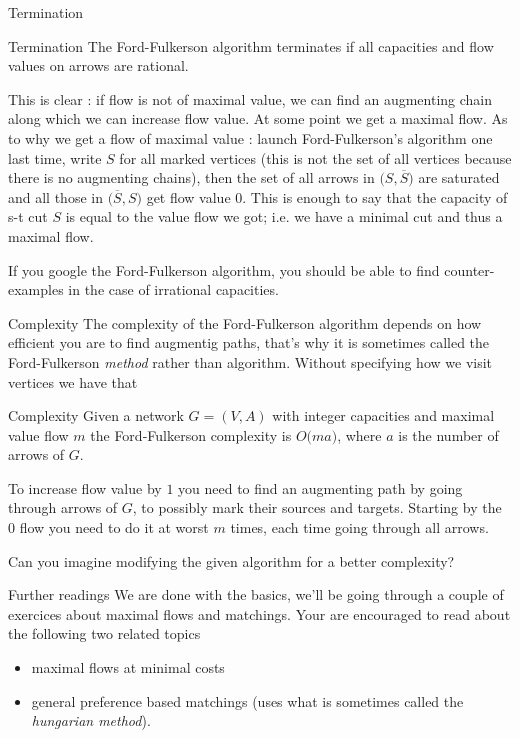 \documentclass[32pt, aspectratio=169]{beamer}
\begin{document}
\begin{frame}{Termination}
  \begin{halfshyblock}{Termination}
    The Ford-Fulkerson algorithm terminates if all capacities and flow
    values on arrows are rational.
  \end{halfshyblock}\pause
  This is clear : if flow is not of maximal value, we can find an
  augmenting chain along which we can increase flow value. At some
  point we get a maximal flow. \pause As to why we get a flow of
  maximal value : launch Ford-Fulkerson's algorithm one last time,
  write $S$ for all marked vertices (this is not the set of all
  vertices because there is no augmenting chains), then the set of all
  arrows in $\big(S, \overline{S}\big)$ are saturated and all those in
  $\big(\overline{S}, S\big)$ get flow value $0$. This is enough to
  say that the capacity of s-t cut $S$ is equal to the value flow we
  got; i.e. we have a minimal cut and thus a maximal flow.
  \begin{rem}
    If you google the Ford-Fulkerson algorithm, you should be able to
    find counter-examples in the case of irrational capacities.
  \end{rem}
\end{frame}

\begin{frame}{Complexity}
  The complexity of the Ford-Fulkerson algorithm depends on how
  efficient you are to find augmentig paths, that's why it is
  sometimes called the Ford-Fulkerson \emph{method} rather than
  algorithm. \pause Without specifying how we visit vertices we have
  that
  \begin{halfshyblock}{Complexity}
    Given a network $G = (V, A)$ with integer capacities and maximal
    value flow $m$ the Ford-Fulkerson complexity is $O\big(ma\big)$,
    where $a$ is the number of arrows of $G$.
  \end{halfshyblock}
  To increase flow value by $1$ you need to find an augmenting path by
  going through arrows of $G$, to possibly mark their sources and
  targets. Starting by the $0$ flow you need to do it at worst $m$
  times, each time going through all arrows. \pause
  \begin{question}
    Can you imagine modifying the given algorithm for a better
    complexity?
  \end{question}
\end{frame}

\begin{frame}{Further readings}
  We are done with the basics, we'll be going through a couple of
  exercices about maximal flows and matchings. \pause Your are
  encouraged to read about the following two related topics
  \begin{itemize}
  \item maximal flows at minimal costs
  \item general preference based matchings (uses what is sometimes
    called the \emph{hungarian method}).
  \end{itemize}
\end{frame}

\end{document}
